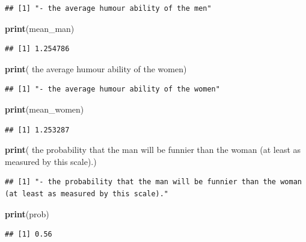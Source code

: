 \documentclass[
  9pt,
]{article}
\newenvironment{Shaded}{\begin{snugshade}}{\end{snugshade}}
\newcommand{\KeywordTok}[1]{\textcolor[rgb]{0.13,0.29,0.53}{\textbf{#1}}}
\newcommand{\NormalTok}[1]{#1}
\newcommand{\StringTok}[1]{\textcolor[rgb]{0.31,0.60,0.02}{#1}}
\begin{document}
\begin{verbatim}
## [1] "- the average humour ability of the men"
\end{verbatim}

\begin{Shaded}
\begin{Highlighting}[]
      \KeywordTok{print}\NormalTok{(mean\_man)}
\end{Highlighting}
\end{Shaded}

\begin{verbatim}
## [1] 1.254786
\end{verbatim}

\begin{Shaded}
\begin{Highlighting}[]
      \KeywordTok{print}\NormalTok{(}\StringTok{\textquotesingle{}{-} the average humour ability of the women\textquotesingle{}}\NormalTok{)}
\end{Highlighting}
\end{Shaded}

\begin{verbatim}
## [1] "- the average humour ability of the women"
\end{verbatim}

\begin{Shaded}
\begin{Highlighting}[]
      \KeywordTok{print}\NormalTok{(mean\_women)}
\end{Highlighting}
\end{Shaded}

\begin{verbatim}
## [1] 1.253287
\end{verbatim}

\begin{Shaded}
\begin{Highlighting}[]
      \KeywordTok{print}\NormalTok{(}\StringTok{\textquotesingle{}{-} the probability that the man will be funnier than the woman (at least as measured by this scale).\textquotesingle{}}\NormalTok{)}
\end{Highlighting}
\end{Shaded}

\begin{verbatim}
## [1] "- the probability that the man will be funnier than the woman (at least as measured by this scale)."
\end{verbatim}

\begin{Shaded}
\begin{Highlighting}[]
      \KeywordTok{print}\NormalTok{(prob)}
\end{Highlighting}
\end{Shaded}

\begin{verbatim}
## [1] 0.56
\end{verbatim}
\end{document}
